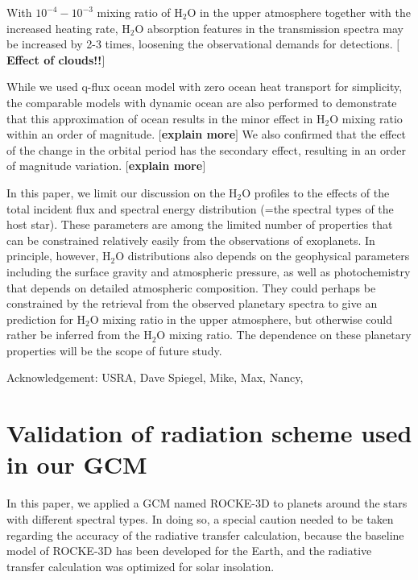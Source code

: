 \documentclass[11pt,numberedappendix,twocolappendix,]{emulateapj}
\def\water{H$_2$O }
\def\memo#1{\color{red}$[${\bf #1}$]$ \color{black}}
\begin{document}
With $10^{-4}-10^{-3}$ mixing ratio of \water in the upper atmosphere together with the increased heating rate, \water absorption features in the transmission spectra may be increased by 2-3 times, loosening the observational demands for detections. 
\memo{Effect of clouds!!}

While we used q-flux ocean model with zero ocean heat transport for simplicity, the comparable models with dynamic ocean are also performed to demonstrate that this approximation of ocean results in the minor effect in \water mixing ratio within an order of magnitude. 
\memo{explain more}
We also confirmed that the effect of the change in the orbital period has the secondary effect, resulting in an order of magnitude variation. 
\memo{explain more}

In this paper, we limit our discussion on the \water profiles to the effects of the total incident flux and spectral energy distribution (=the spectral types of the host star). 
These parameters are among the limited number of properties that can be constrained relatively easily from the observations of exoplanets. 
In principle, however, \water distributions also depends on the geophysical parameters including the surface gravity and atmospheric pressure, as well as photochemistry that depends on detailed atmospheric composition. 
They could perhaps be constrained by the retrieval from the observed planetary spectra to give an prediction for \water mixing ratio in the upper atmosphere, but  otherwise could rather be inferred from the \water mixing ratio. 
The dependence on these planetary properties will be the scope of future study. 





\acknowledgments
Acknowledgement: USRA, Dave Spiegel, Mike, Max, Nancy, 




\appendix


\section{Validation of radiation scheme used in our GCM}
\label{ap:radiation}

In this paper, we applied a GCM named ROCKE-3D to planets around the stars with different spectral types. 
In doing so, a special caution needed to be taken regarding the accuracy of the radiative transfer calculation, because the baseline model of ROCKE-3D has been developed for the Earth, and the radiative transfer calculation was optimized for solar insolation. 
\end{document}
